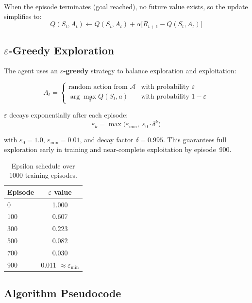 \documentclass[12pt]{article}
\begin{document}
When the episode terminates (goal reached), no future value exists, so the
update simplifies to:
\[
    Q(S_t, A_t) \leftarrow Q(S_t, A_t) + \alpha\bigl[R_{t+1} - Q(S_t, A_t)\bigr]
\]

\subsection{$\varepsilon$-Greedy Exploration}

The agent uses an \textbf{$\varepsilon$-greedy} strategy to balance exploration
and exploitation:

\[
    A_t =
    \begin{cases}
        \text{random action from } \mathcal{A} & \text{with probability } \varepsilon \\
        \arg\max_{a} Q(S_t, a)                  & \text{with probability } 1 - \varepsilon
    \end{cases}
\]

$\varepsilon$ decays exponentially after each episode:
\[
    \varepsilon_k = \max\!\bigl(\varepsilon_{\min},\;
                                \varepsilon_0 \cdot \delta^k\bigr)
\]

with $\varepsilon_0 = 1.0$, $\varepsilon_{\min} = 0.01$, and decay factor
$\delta = 0.995$. This guarantees full exploration early in training and
near-complete exploitation by episode~900.

\begin{table}[H]
\centering
\begin{tabular}{@{} l c @{}}
\toprule
\textbf{Episode} & \textbf{$\varepsilon$ value} \\
\midrule
0   & 1.000 \\
100 & 0.607 \\
300 & 0.223 \\
500 & 0.082 \\
700 & 0.030 \\
900 & 0.011 $\approx \varepsilon_{\min}$ \\
\bottomrule
\end{tabular}
\caption{Epsilon schedule over 1000 training episodes.}
\end{table}

\subsection{Algorithm Pseudocode}
\end{document}
